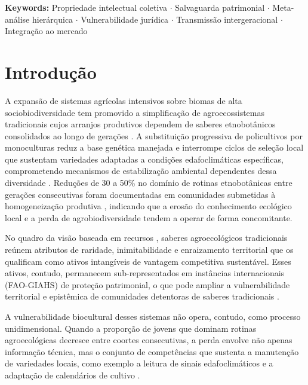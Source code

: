 \documentclass[12pt,a4paper]{article}
\begin{document}
\medskip
\noindent\textbf{Keywords:} Propriedade intelectual coletiva $\cdot$ Salvaguarda patrimonial $\cdot$ Meta-análise hierárquica $\cdot$ Vulnerabilidade jurídica $\cdot$ Transmissão intergeracional $\cdot$ Integração ao mercado

\linenumbers

\section{Introdução}
\label{sec:intro}

A expansão de sistemas agrícolas intensivos sobre biomas de alta sociobiodiversidade tem promovido a simplificação de agroecossistemas tradicionais cujos arranjos produtivos dependem de saberes etnobotânicos consolidados ao longo de gerações \citep{Altieri2004}. A substituição progressiva de policultivos por monoculturas reduz a base genética manejada e interrompe ciclos de seleção local que sustentam variedades adaptadas a condições edafoclimáticas específicas, comprometendo mecanismos de estabilização ambiental dependentes dessa diversidade \citep{Jarvis2008}. Reduções de 30 a 50\% no domínio de rotinas etnobotânicas entre gerações consecutivas foram documentadas em comunidades submetidas à homogeneização produtiva \citep{ReyesGarcia2013}, indicando que a erosão do conhecimento ecológico local e a perda de agrobiodiversidade tendem a operar de forma concomitante.

No quadro da visão baseada em recursos \citep{Barney1991}, saberes agroecológicos tradicionais reúnem atributos de raridade, inimitabilidade e enraizamento territorial que os qualificam como ativos intangíveis de vantagem competitiva sustentável. Esses ativos, contudo, permanecem sub-representados em instâncias internacionais (FAO-GIAHS) de proteção patrimonial, o que pode ampliar a vulnerabilidade territorial e epistêmica de comunidades detentoras de saberes tradicionais \citep{Santilli2009,Cunha2009,Goncalves2022}.

A vulnerabilidade biocultural desses sistemas não opera, contudo, como processo unidimensional. Quando a proporção de jovens que dominam rotinas agroecológicas decresce entre coortes consecutivas, a perda envolve não apenas informação técnica, mas o conjunto de competências que sustenta a manutenção de variedades locais, como exemplo a leitura de sinais edafoclimáticos e a adaptação de calendários de cultivo \citep{ReyesGarcia2013,GomezBaggethun2013}.
\end{document}
